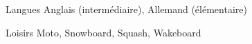 

\begin{cvskills}

  \cvskill
    {Langues} %
    {Anglais (intermédiaire), Allemand (élémentaire)} %

  \cvskill
    {Loisirs} %
    {Moto, Snowboard, Squash, Wakeboard} %
\end{cvskills}
